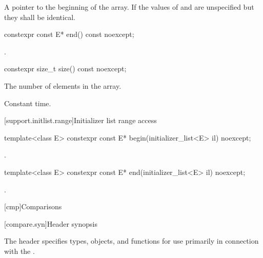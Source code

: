 \begin{itemdescr}
\pnum
\returns A pointer to the beginning of the array. If  the
values of  and  are unspecified but they shall be
identical.
\end{itemdescr}

%
\begin{itemdecl}
constexpr const E* end() const noexcept;
\end{itemdecl}

\begin{itemdescr}
\pnum
\returns {}.
\end{itemdescr}

%
\begin{itemdecl}
constexpr size_t size() const noexcept;
\end{itemdecl}

\begin{itemdescr}
\pnum
\returns The number of elements in the array.

\pnum
\complexity Constant time.
\end{itemdescr}

[support.initlist.range]{Initializer list range access}

%
\begin{itemdecl}
template<class E> constexpr const E* begin(initializer_list<E> il) noexcept;
\end{itemdecl}

\begin{itemdescr}
\pnum
\returns {}.
\end{itemdescr}

%
\begin{itemdecl}
template<class E> constexpr const E* end(initializer_list<E> il) noexcept;
\end{itemdecl}

\begin{itemdescr}
\pnum
\returns {}.
\end{itemdescr}

[cmp]{Comparisons}

[compare.syn]{Header  synopsis}

\pnum
The header  specifies types, objects, and functions
for use primarily in connection with
the .

